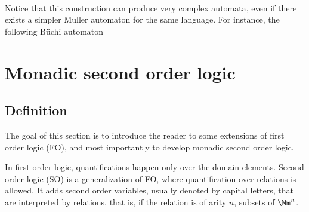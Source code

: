 \paragraph*{}
Notice that this construction can produce very complex
automata, even if there exists a simpler Muller automaton
for the same language. For instance,
the following Büchi automaton



\section{Monadic second order logic}
\subsection{Definition}

The goal of this section is to introduce the reader
to some extensions of first order logic (FO),
and most importantly to develop monadic second order logic.

In first order logic, quantifications happen only over the
domain elements.
Second order logic (SO) is a generalization of FO,
where quantification over relations is allowed.
It adds second order variables, usually denoted by capital
letters, that are interpreted by relations, that is,
if the relation is of arity $n$, subsets of $\Mm^n$.

